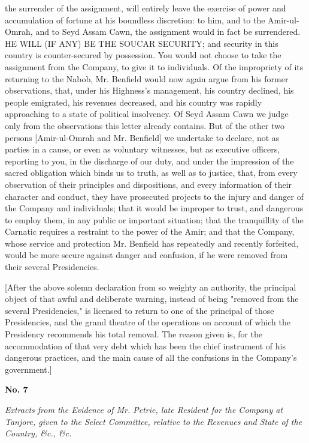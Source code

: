 the surrender of the assignment, will entirely leave the exercise of power and accumulation of fortune at his boundless discretion: to him, and to the Amir-ul-Omrah, and to Seyd Assam Cawn, the assignment would in fact be surrendered. HE WILL (IF ANY) BE THE SOUCAR SECURITY; and security in this country is counter-secured by possession. You would not choose to take the assignment from the Company, to give it to individuals. Of the impropriety of its returning to the Nabob, Mr. Benfield would now again argue from his former observations, that, under his Highness's management, his country declined, his people emigrated, his revenues decreased, and his country was rapidly approaching to a state of political insolvency. Of Seyd Assam Cawn we judge only from the observations this letter already contains. But of the other two persons [Amir-ul-Omrah and Mr. Benfield] we undertake to declare, not as parties in a cause, or even as voluntary witnesses, but as executive officers, reporting to you, in the discharge of our duty, and under the impression of the sacred obligation which binds us to truth, as well as to justice, that, from every observation of their principles and dispositions, and every information of their character and conduct, they have prosecuted projects to the injury and danger of the Company and individuals; that it would be improper to trust, and dangerous to employ them, in any public or important situation; that the tranquillity of the Carnatic requires a restraint to the power of the Amir; and that the Company, whose service and protection Mr. Benfield has repeatedly and recently forfeited, would be more secure against danger and confusion, if he were removed from their several Presidencies.

[After the above solemn declaration from so weighty an authority, the principal object of that awful and deliberate warning, instead of being "removed from the several Presidencies," is licensed to return to one of the principal of those Presidencies, and the grand theatre of the operations on account of which the Presidency recommends his total removal. The reason given is, for the accommodation of that very debt which has been the chief instrument of his dangerous practices, and the main cause of all the confusions in the Company's government.]

\PRLsep
\begin{center}
  \textbf{\large No. 7} \par 
\end{center}
\textit{Extracts from the Evidence of Mr. Petrie, late Resident for the Company at Tanjore, given to the Select Committee, relative to the Revenues and State of the Country, \&c., \&c.}
\vspace{0.3cm}

